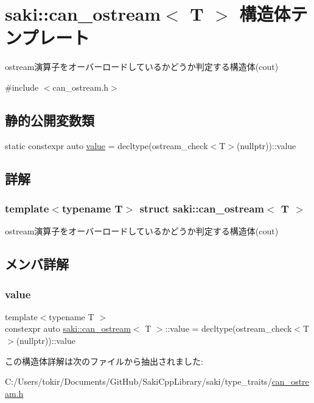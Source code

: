 \hypertarget{structsaki_1_1can__ostream}{}\section{saki\+:\+:can\+\_\+ostream$<$ T $>$ 構造体テンプレート}
\label{structsaki_1_1can__ostream}


ostream演算子をオーバーロードしているかどうか判定する構造体(cout)  




{\ttfamily \#include $<$can\+\_\+ostream.\+h$>$}

\subsection*{静的公開変数類}
\begin{DoxyCompactItemize}
\item 
static constexpr auto \mbox{\hyperlink{structsaki_1_1can__ostream_a949a7959b4856ff60149c82f2b1f56fd}{value}} = decltype(ostream\+\_\+check$<$T$>$(nullptr))\+::value
\end{DoxyCompactItemize}


\subsection{詳解}
\subsubsection*{template$<$typename T$>$\newline
struct saki\+::can\+\_\+ostream$<$ T $>$}

ostream演算子をオーバーロードしているかどうか判定する構造体(cout) 

\subsection{メンバ詳解}
\mbox{\label{structsaki_1_1can__ostream_a949a7959b4856ff60149c82f2b1f56fd}} 
\subsubsection{\texorpdfstring{value}{value}}
{\footnotesize\ttfamily template$<$typename T $>$ \\
constexpr auto \mbox{\hyperlink{structsaki_1_1can__ostream}{saki\+::can\+\_\+ostream}}$<$ T $>$\+::value = decltype(ostream\+\_\+check$<$T$>$(nullptr))\+::value\hspace{0.3cm}{\ttfamily [static]}}



この構造体詳解は次のファイルから抽出されました\+:\begin{DoxyCompactItemize}
\item 
C\+:/\+Users/tokir/\+Documents/\+Git\+Hub/\+Saki\+Cpp\+Library/saki/type\+\_\+traits/\mbox{\hyperlink{can__ostream_8h}{can\+\_\+ostream.\+h}}\end{DoxyCompactItemize}
